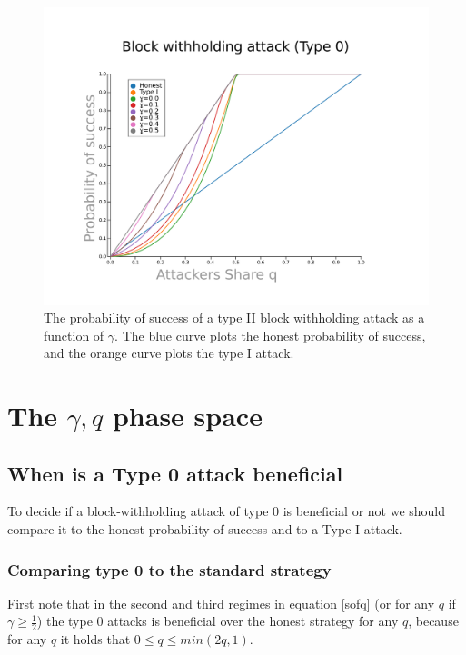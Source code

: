 \documentclass[letterpaper,12pt]{report}
\theoremstyle{plain}
\theoremstyle{definition}
\begin{document}
\begin{figure}[blockwithholdingtype2]
\centering
\includegraphics[width=200mm]{type0pos.pdf}
\caption{The probability of success of a type II block withholding attack as a function of $\gamma$. The blue curve plots the honest probability of success, and the orange curve plots the type I attack.}
\label{fig:type0pos}
\end{figure}

\section{The $\gamma,q$ phase space}\label{gqphase}

\subsection{When is a Type 0 attack beneficial}

To decide if a block-withholding attack of type 0 is beneficial or not we should compare it to the honest probability of success and to a Type I attack. 

\subsubsection{Comparing type 0 to the standard strategy}
First note that in the second and third regimes in equation \ref{sofq} (or for any $q$ if $\gamma\geq\frac{1}{2}$) the type 0 attacks is beneficial over the honest strategy for any $q$, because for any $q$ it holds that $0\leq q \leq min(2q,1)$. 
\end{document}
